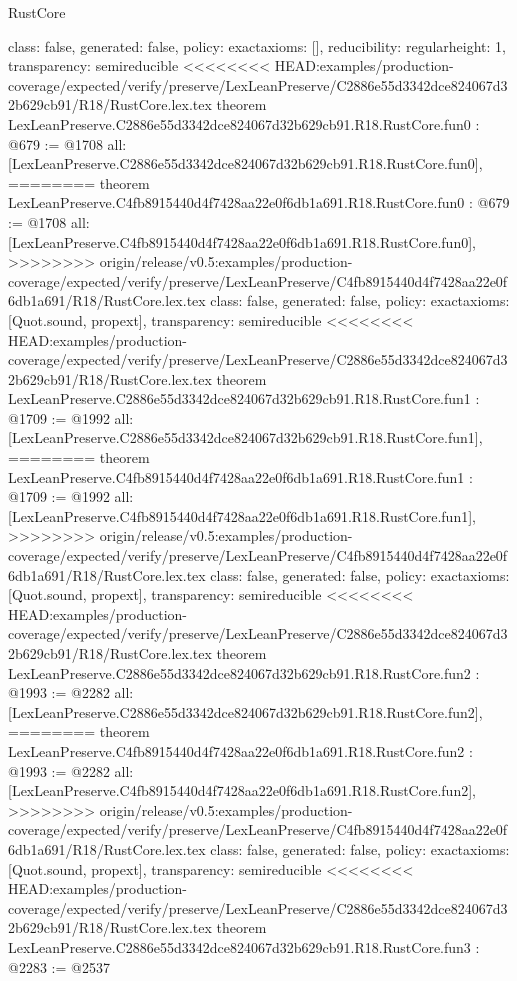 \begin{lexlean}{RustCore}
\begin{coremodule}
{\begin{coremodule}
{{{  class: false,
  generated: false,
  policy: exact{axioms: []},
  reducibility: regular{height: 1},
  transparency: semireducible
}
<<<<<<<< HEAD:examples/production-coverage/expected/verify/preserve/LexLeanPreserve/C2886e55d3342dce824067d32b629cb91/R18/RustCore.lex.tex
theorem LexLeanPreserve.C2886e55d3342dce824067d32b629cb91.R18.RustCore.fun0 : @679 := @1708 {
  all: [LexLeanPreserve.C2886e55d3342dce824067d32b629cb91.R18.RustCore.fun0],
========
theorem LexLeanPreserve.C4fb8915440d4f7428aa22e0f6db1a691.R18.RustCore.fun0 : @679 := @1708 {
  all: [LexLeanPreserve.C4fb8915440d4f7428aa22e0f6db1a691.R18.RustCore.fun0],
>>>>>>>> origin/release/v0.5:examples/production-coverage/expected/verify/preserve/LexLeanPreserve/C4fb8915440d4f7428aa22e0f6db1a691/R18/RustCore.lex.tex
  class: false,
  generated: false,
  policy: exact{axioms: [Quot.sound, propext]},
  transparency: semireducible
}
<<<<<<<< HEAD:examples/production-coverage/expected/verify/preserve/LexLeanPreserve/C2886e55d3342dce824067d32b629cb91/R18/RustCore.lex.tex
theorem LexLeanPreserve.C2886e55d3342dce824067d32b629cb91.R18.RustCore.fun1 : @1709 := @1992 {
  all: [LexLeanPreserve.C2886e55d3342dce824067d32b629cb91.R18.RustCore.fun1],
========
theorem LexLeanPreserve.C4fb8915440d4f7428aa22e0f6db1a691.R18.RustCore.fun1 : @1709 := @1992 {
  all: [LexLeanPreserve.C4fb8915440d4f7428aa22e0f6db1a691.R18.RustCore.fun1],
>>>>>>>> origin/release/v0.5:examples/production-coverage/expected/verify/preserve/LexLeanPreserve/C4fb8915440d4f7428aa22e0f6db1a691/R18/RustCore.lex.tex
  class: false,
  generated: false,
  policy: exact{axioms: [Quot.sound, propext]},
  transparency: semireducible
}
<<<<<<<< HEAD:examples/production-coverage/expected/verify/preserve/LexLeanPreserve/C2886e55d3342dce824067d32b629cb91/R18/RustCore.lex.tex
theorem LexLeanPreserve.C2886e55d3342dce824067d32b629cb91.R18.RustCore.fun2 : @1993 := @2282 {
  all: [LexLeanPreserve.C2886e55d3342dce824067d32b629cb91.R18.RustCore.fun2],
========
theorem LexLeanPreserve.C4fb8915440d4f7428aa22e0f6db1a691.R18.RustCore.fun2 : @1993 := @2282 {
  all: [LexLeanPreserve.C4fb8915440d4f7428aa22e0f6db1a691.R18.RustCore.fun2],
>>>>>>>> origin/release/v0.5:examples/production-coverage/expected/verify/preserve/LexLeanPreserve/C4fb8915440d4f7428aa22e0f6db1a691/R18/RustCore.lex.tex
  class: false,
  generated: false,
  policy: exact{axioms: [Quot.sound, propext]},
  transparency: semireducible
}
<<<<<<<< HEAD:examples/production-coverage/expected/verify/preserve/LexLeanPreserve/C2886e55d3342dce824067d32b629cb91/R18/RustCore.lex.tex
theorem LexLeanPreserve.C2886e55d3342dce824067d32b629cb91.R18.RustCore.fun3 : @2283 := @2537 {
}}}}}}
\end{coremodule}}
\end{coremodule}
\end{lexlean}
